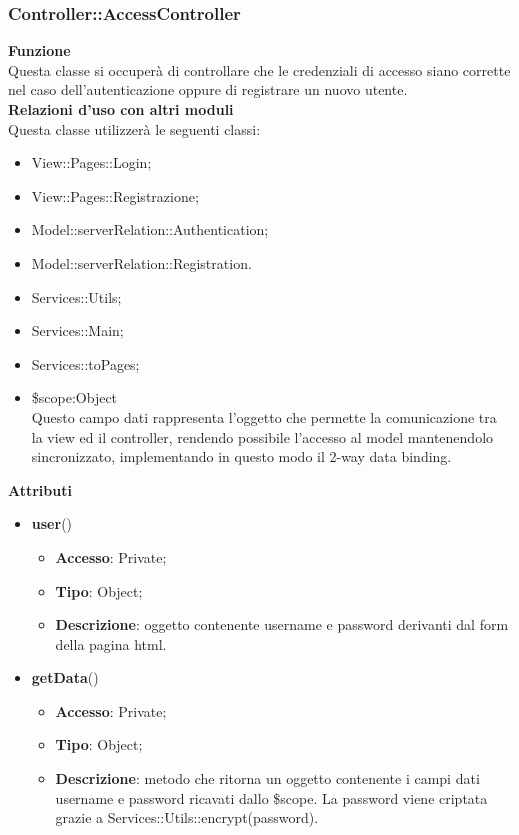 {\subsubsection{Controller::AccessController}{
	\label{sub:AccessController}
	\textbf{Funzione}\\
		\indent Questa classe si occuperà di controllare che le credenziali di accesso siano corrette nel caso dell'autenticazione oppure di registrare un nuovo utente.\\
	\textbf{Relazioni d'uso con altri moduli}\\
		\indent Questa classe utilizzerà le seguenti classi:
	\begin{itemize}
		\item View::Pages::Login;
		\item View::Pages::Registrazione;
		\item Model::\-serverRelation::\-Authentication;
		\item Model::\-serverRelation::\-Registration.
		\item Services::Utils;
		\item Services::Main;
		\item Services::toPages;
		\item \$scope:Object\\
    		\indent Questo campo dati rappresenta l’oggetto che permette la comunicazione tra la view ed il controller, rendendo possibile l’accesso al model mantenendolo sincronizzato, implementando in questo modo il 2-way data binding.
	\end{itemize}
	\textbf{Attributi}\\
    \begin{itemize}
    	\item \textbf{user}()
		\begin{itemize}
			\item \textbf{Accesso}: Private;
			\item \textbf{Tipo}: Object;
			\item \textbf{Descrizione}: oggetto contenente username e password derivanti dal form della pagina html.
		\end{itemize}
    	\item \textbf{getData}()
		\begin{itemize}
			\item \textbf{Accesso}: Private;
			\item \textbf{Tipo}: Object;
			\item \textbf{Descrizione}: metodo che ritorna un oggetto contenente i campi dati username e password ricavati dallo \$scope. La password viene criptata grazie a Services::\-Utils::\-encrypt(password).

\end{itemize}
\end{itemize}}}
